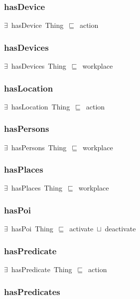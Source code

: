 \documentclass{article}
\begin{document}
\subsubsection*{hasDevice}

\ensuremath{\exists}~hasDevice~Thing~\ensuremath{\sqsubseteq}~action

\subsubsection*{hasDevices}

\ensuremath{\exists}~hasDevices~Thing~\ensuremath{\sqsubseteq}~workplace

\subsubsection*{hasLocation}

\ensuremath{\exists}~hasLocation~Thing~\ensuremath{\sqsubseteq}~action

\subsubsection*{hasPersons}

\ensuremath{\exists}~hasPersons~Thing~\ensuremath{\sqsubseteq}~workplace

\subsubsection*{hasPlaces}

\ensuremath{\exists}~hasPlaces~Thing~\ensuremath{\sqsubseteq}~workplace

\subsubsection*{hasPoi}

\ensuremath{\exists}~hasPoi~Thing~\ensuremath{\sqsubseteq}~activate~\ensuremath{\sqcup}~deactivate

\subsubsection*{hasPredicate}

\ensuremath{\exists}~hasPredicate~Thing~\ensuremath{\sqsubseteq}~action

\subsubsection*{hasPredicates}
\end{document}
